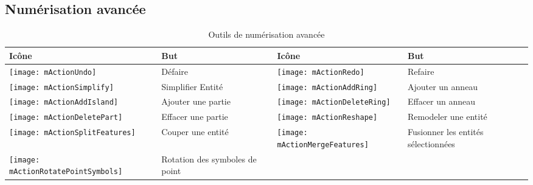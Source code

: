 
\subsection{Numérisation avancée}
\label{sec:advanced_edit}

\begin{table}[h]
\centering
\begin{tabular}{|l|p{5.5cm}|l|p{5.5cm}|}
\hline \textbf{Icône} & \textbf{But} & \textbf{Icône} & \textbf{But} \\
\hline \texttt{[image: mActionUndo]}
   & Défaire 
   & \texttt{[image: mActionRedo]}
   & Refaire \\
\hline \texttt{[image: mActionSimplify]}
   & Simplifier Entité
   & \texttt{[image: mActionAddRing]}
   & Ajouter un anneau \\
\hline \texttt{[image: mActionAddIsland]}
   & Ajouter une partie
   & \texttt{[image: mActionDeleteRing]}
   & Effacer un anneau \\
\hline \texttt{[image: mActionDeletePart]}
   & Effacer une partie
   & \texttt{[image: mActionReshape]}
   & Remodeler une entité \\
\hline \texttt{[image: mActionSplitFeatures]}
   & Couper une entité
   & \texttt{[image: mActionMergeFeatures]}
   & Fusionner les entités sélectionnées \\
\hline \texttt{[image: mActionRotatePointSymbols]}
   & Rotation des symboles de point
   &
   & \\
\hline
\end{tabular}
\caption{Outils de numérisation avancée}\label{tab:advanced_editing}
\end{table}


